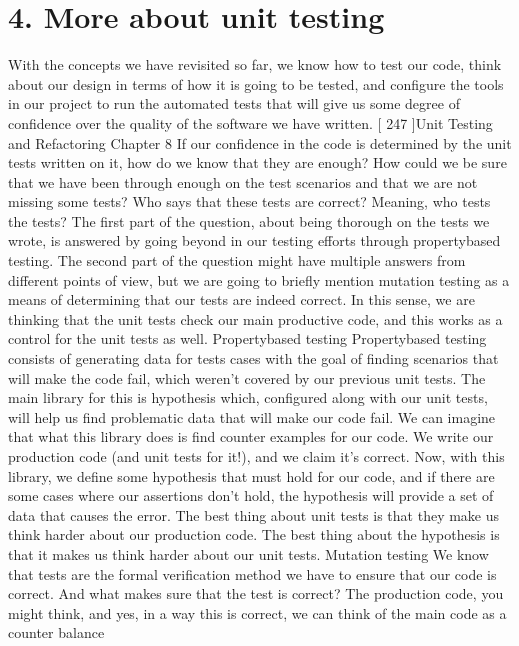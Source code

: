 \documentclass[a4paper,10pt,english]{sphinxmanual}
\begin{document}
\section{4. More about unit testing}
\label{\detokenize{chapters/8_unit_testing/index:more-about-unit-testing}}
With the concepts we have revisited so far, we know how to test our code, think about our
design in terms of how it is going to be tested, and configure the tools in our project to run
the automated tests that will give us some degree of confidence over the quality of the
software we have written.
{[} 247 {]}Unit Testing and Refactoring
Chapter 8
If our confidence in the code is determined by the unit tests written on it, how do we know
that they are enough? How could we be sure that we have been through enough on the test
scenarios and that we are not missing some tests? Who says that these tests are correct?
Meaning, who tests the tests?
The first part of the question, about being thorough on the tests we wrote, is answered by
going beyond in our testing efforts through property\sphinxhyphen{}based testing.
The second part of the question might have multiple answers from different points of view,
but we are going to briefly mention mutation testing as a means of determining that our
tests are indeed correct. In this sense, we are thinking that the unit tests check our main
productive code, and this works as a control for the unit tests as well.
Property\sphinxhyphen{}based testing
Property\sphinxhyphen{}based testing consists of generating data for tests cases with the goal of finding
scenarios that will make the code fail, which weren’t covered by our previous unit tests.
The main library for this is hypothesis which, configured along with our unit tests, will
help us find problematic data that will make our code fail.
We can imagine that what this library does is find counter examples for our code. We write
our production code (and unit tests for it!), and we claim it’s correct. Now, with this library,
we define some hypothesis that must hold for our code, and if there are some cases where
our assertions don’t hold, the hypothesis will provide a set of data that causes the error.
The best thing about unit tests is that they make us think harder about our production code.
The best thing about the hypothesis is that it makes us think harder about our unit tests.
Mutation testing
We know that tests are the formal verification method we have to ensure that our code is
correct. And what makes sure that the test is correct? The production code, you might
think, and yes, in a way this is correct, we can think of the main code as a counter balance
\end{document}
